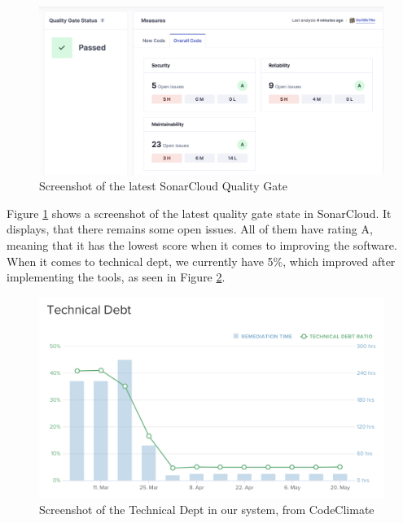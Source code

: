 \begin{figure}[H]
    \centering
    \includegraphics[width=\textwidth]{images/QualityGate.png}
    \caption{Screenshot of the latest SonarCloud Quality Gate}
    \label{img:qualitygate}
\end{figure}

\noindent Figure \ref{img:qualitygate} shows a screenshot of the latest quality gate state in SonarCloud. It displays, that there remains some open issues.  All of them have rating A, meaning that it has the lowest score when it comes to improving the software. \cite{codeclimate} When it comes to technical dept, we currently have 5\%, which improved after implementing the tools, as seen in Figure \ref{img:technical dept}. 

\begin{figure}[H]
    \centering
    \includegraphics[width=\textwidth]{images/Technical Debt.png}
    \caption{Screenshot of the Technical Dept in our system, from CodeClimate}
    \label{img:technical dept}
\end{figure}


